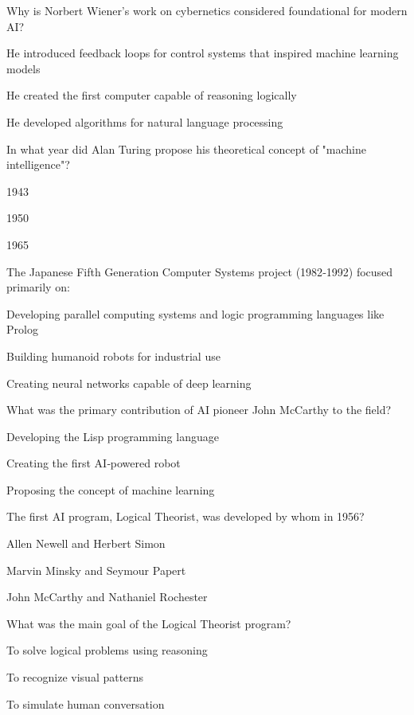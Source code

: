 \begin{enhancedmcq}{Why is Norbert Wiener's work on cybernetics considered foundational for modern AI?}
\item He introduced feedback loops for control systems that inspired machine learning models
\item He created the first computer capable of reasoning logically
\item He developed algorithms for natural language processing

\end{enhancedmcq}
\begin{enhancedmcq}{In what year did Alan Turing propose his theoretical concept of "machine intelligence"?}
\item 1943
\item 1950
\item 1965

\end{enhancedmcq}
\begin{enhancedmcq}{The Japanese Fifth Generation Computer Systems project (1982‑1992) focused primarily on:}
\item Developing parallel computing systems and logic programming languages like Prolog
\item Building humanoid robots for industrial use
\item Creating neural networks capable of deep learning

\end{enhancedmcq}
\begin{enhancedmcq}{What was the primary contribution of AI pioneer John McCarthy to the field?}
\item Developing the Lisp programming language
\item Creating the first AI‑powered robot
\item Proposing the concept of machine learning

\end{enhancedmcq}
\begin{enhancedmcq}{The first AI program, Logical Theorist, was developed by whom in 1956?}
\item Allen Newell and Herbert Simon
\item Marvin Minsky and Seymour Papert
\item John McCarthy and Nathaniel Rochester

\end{enhancedmcq}
\begin{enhancedmcq}{What was the main goal of the Logical Theorist program?}
\item To solve logical problems using reasoning
\item To recognize visual patterns
\item To simulate human conversation

\end{enhancedmcq}
